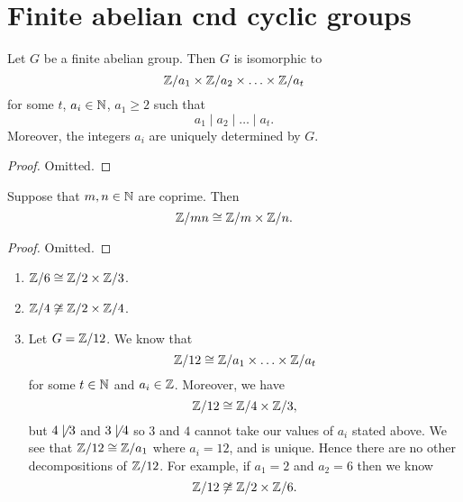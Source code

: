 \chapter{Finite abelian cnd cyclic groups}

\begin{theorem}[]
    Let $G$ be a finite abelian group.
    Then $G$ is isomorphic to
    \[
        \mathbb{Z}/a_1 \times \mathbb{Z}/a_2 \times \ldots \times \mathbb{Z}/a_t
    \]
    for some $t$, $a_i \in \mathbb{N}$, $a_1 \geq 2$ such that
    \[
        a_1 \mid a_2 \mid \ldots \mid a_t.
    \]
    Moreover, the integers $a_i$ are uniquely determined by $G$.
\end{theorem}

\begin{proof}
    Omitted.
\end{proof}

\begin{theorem}[CRT]
    Suppose that $m, n \in \mathbb{N}$ are coprime.
    Then 
    \[
        \mathbb{Z}/mn \cong \mathbb{Z}/m \times \mathbb{Z}/n.
    \]
\end{theorem}

\begin{proof}
    Omitted.
\end{proof}

\begin{example}
    \begin{enumerate}
        \item 
            $\mathbb{Z}/6 \cong \mathbb{Z}/2 \times \mathbb{Z}/3$.

        \item
            $\mathbb{Z}/4 \not\cong \mathbb{Z}/2 \times \mathbb{Z}/4$.

        \item 
            Let $G = \mathbb{Z}/12$.
            We know that
            \[
                \mathbb{Z}/12 \cong \mathbb{Z}/a_1 \times \ldots \times \mathbb{Z}/a_t
            \]
            for some $t \in \mathbb{N}$ and $a_i \in \mathbb{Z}$.
            Moreover, we have
            \[
                \mathbb{Z}/12 \cong \mathbb{Z}/4 \times \mathbb{Z}/3,
            \]
            but $4 \not\mid 3$ and $3 \not\mid 4$ so $3$ and $4$ cannot take our values of $a_i$
            stated above.
            We see that $\mathbb{Z}/12 \cong \mathbb{Z}/a_1$ where $a_i = 12$, and is unique. 
            Hence there are no other decompositions of $\mathbb{Z}/12$.
            For example, if $a_1 = 2$ and $a_2 = 6$ then we know
            \[
                \mathbb{Z}/12 \not\cong \mathbb{Z}/2 \times \mathbb{Z}/6.
            \]
    \end{enumerate}
\end{example}

